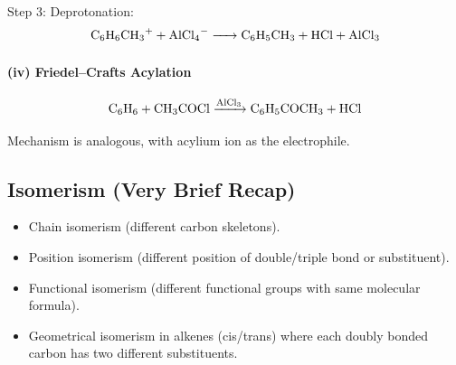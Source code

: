 \documentclass[12pt,a4paper]{article}
\begin{document}
Step 3: Deprotonation:
\[
\ce{C6H6CH3^+ + AlCl4^- -> C6H5CH3 + HCl + AlCl3}
\]

\paragraph{(iv) Friedel–Crafts Acylation}
\[
\ce{C6H6 + CH3COCl ->[AlCl3] C6H5COCH3 + HCl}
\]

Mechanism is analogous, with acylium ion  as the electrophile.

\subsection{Isomerism (Very Brief Recap)}
\begin{itemize}
    \item Chain isomerism (different carbon skeletons).
    \item Position isomerism (different position of double/triple bond or substituent).
    \item Functional isomerism (different functional groups with same molecular formula).
    \item Geometrical isomerism in alkenes (cis/trans) where each doubly bonded carbon has two different substituents.
\end{itemize}

\end{document}

